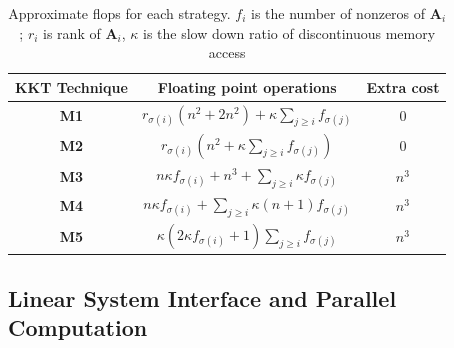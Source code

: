 \begin{table}[h]
  \centering
  \caption{Approximate flops for each strategy. $f_i$ is the number of nonzeros of $\mathbf{A}_i$; $r_i$ is rank of $\mathbf{A}_i$, $\kappa$ is the slow down ratio of discontinuous memory access}
  \begin{tabular}{ccc}
  \toprule
    KKT Technique & Floating point operations & Extra cost \\
    \midrule
    {\textbf{M1}} & $r_{\sigma (i)} (n^2 + 2 n^2) + \kappa \sum_{j \geq i}
    f_{\sigma (j)}$ & 0\\
    {\textbf{M2}} & $r_{\sigma (i)} ( n^2 + \kappa \sum_{j \geq i}
    f_{\sigma (j)} )$ & 0 \\
    {\textbf{M3}} & $n \kappa f_{\sigma (i)} + n^3 + \sum_{j \geq i} \kappa
    f_{\sigma (j)}$ & $n^3$ \\
    {\textbf{M4}} & $n \kappa f_{\sigma (i)} + \sum_{j \geq i} \kappa (n +
    1) f_{\sigma (j)}$ & $n^3$\\
    {\textbf{M5}} & $\kappa (2 \kappa f_{\sigma (i)} + 1)  \sum_{j \geq i}
    f_{\sigma (j)}$ & $n^3$\\
    \bottomrule
  \end{tabular}
\end{table}


\subsection{Linear System Interface and Parallel Computation}

